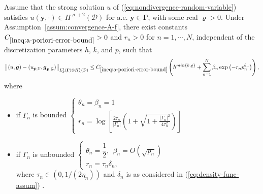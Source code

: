 \documentclass[final,onefignum,onetabnum]{mousaviart}
\begin{document}
			\vspace*{1mm}
			\begin{theorem}
				\label{The:a-poriori-error-bound}
				Assume that the strong solution $u$ of (\ref{eq:nondivergence-random-variable}) satisfies $u(\boldsymbol{y}, \cdot) \in H^{\varrho+2}(\mathcal{D})$ for a.e. $\boldsymbol{y} \in \boldsymbol{\Gamma}$, with some real $\varrho > 0$. Under Assumption~\ref{assum:convergence-A-f}, there exist constants $C_{\ref{ineq:a-poriori-error-bound}}>0$ and $r_n>0$ for $n = 1, \cdots, N$, independent of the discretization parameters  $h$, $k$, and $p$, such that
				\begin{equation}
					\label{ineq:a-poriori-error-bound}
					\left\|  (u, \boldsymbol{g}) - (u_{\boldsymbol{p},\mathbb{U}}, \boldsymbol{g}_{\boldsymbol{p},\mathbb{G}})\right\| _{ L^2_\rho(\boldsymbol{\Gamma}) \otimes H^1_h(\mathcal{D}) }
					\leq 
					C_{\ref{ineq:a-poriori-error-bound}}
					\left(
					h^{min\lbrace k, \varrho \rbrace } 
					+
					\sum_{n=1}^{N}{\beta_n \exp\left( -r_n p_n^{\theta_n} \right) }
					\right), 
				\end{equation}
				where 
				\begin{itemize}
					\item 
					if $\Gamma_n$ is bounded \quad
					$\begin{cases}
						\theta_n = \beta_n = 1
						\\
						r_n = \log \left[  \frac{2\tau_n}{\lvert \Gamma_n \rvert} \left( 1+ \sqrt{1+ \frac{\lvert \Gamma_n \rvert^2}{4\tau_n^2}} \right) \right] 
					\end{cases}$
					\item 
					if $\Gamma_n$ is unbounded  \quad 
					$\begin{cases}
						\theta_n = \dfrac{1}{2}, ~~ \beta_n = O(\sqrt{p_n})
						\\
						r_n = \tau_n\delta_n,
					\end{cases}$
					\\
					where 
					$\tau_n \in (0, {1}/{(2\eta_n)})$
					and $\delta_n$ is as considered in (\ref{eq:density-func-assum}) . 
				\end{itemize}
			\end{theorem}
			
\end{document}
